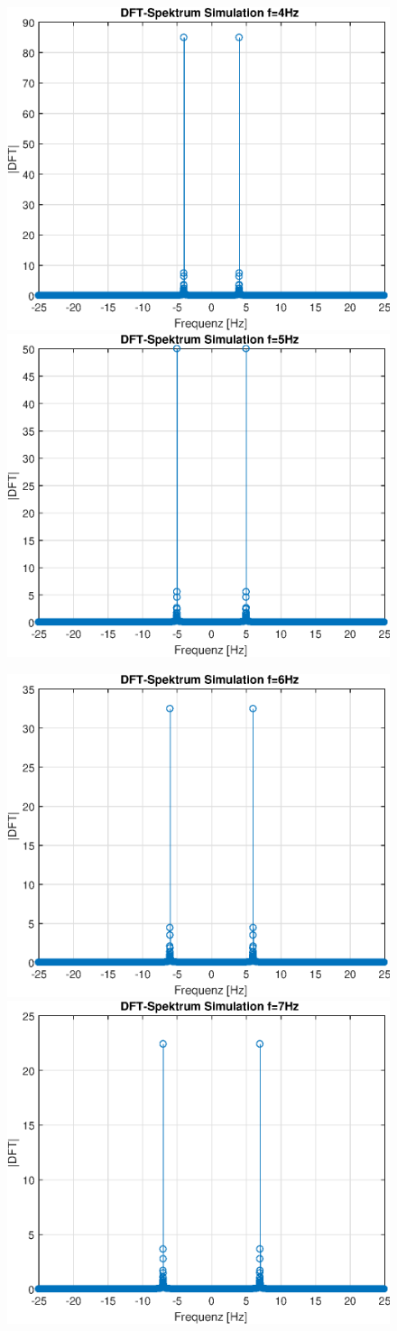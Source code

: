 \documentclass{article}
\begin{document}
\begin{figure}[!h]
\includegraphics[width=0.5\linewidth]{img/sim_fft_sine_freq_4}
\includegraphics[width=0.5\linewidth]{img/sim_fft_sine_freq_5}
\end{figure}
\begin{figure}[!h]
\includegraphics[width=0.5\linewidth]{img/sim_fft_sine_freq_6}
\includegraphics[width=0.5\linewidth]{img/sim_fft_sine_freq_7}
\end{figure}
\end{document}
